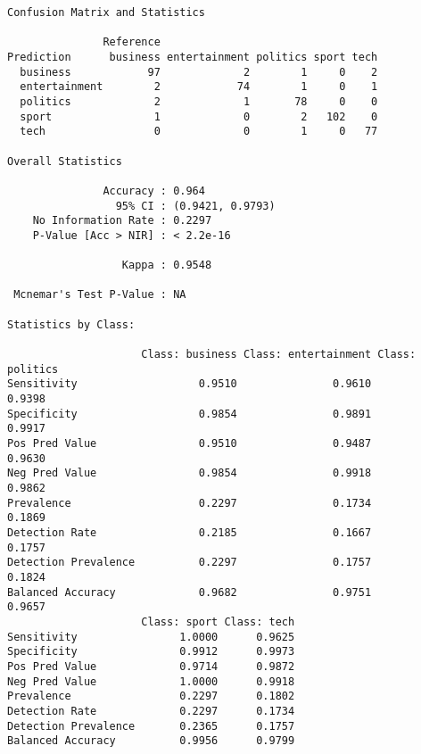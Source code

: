\documentclass[
  12pt,
  letterpaper,
  DIV=11,
  numbers=noendperiod]{scrartcl}
\newenvironment{Shaded}{\begin{snugshade}}{\end{snugshade}}
\newcommand{\CommentTok}[1]{\textcolor[rgb]{0.37,0.37,0.37}{#1}}
\newcommand{\FunctionTok}[1]{\textcolor[rgb]{0.28,0.35,0.67}{#1}}
\newcommand{\NormalTok}[1]{\textcolor[rgb]{0.00,0.23,0.31}{#1}}
\newcommand{\OtherTok}[1]{\textcolor[rgb]{0.00,0.23,0.31}{#1}}
\newcommand{\SpecialCharTok}[1]{\textcolor[rgb]{0.37,0.37,0.37}{#1}}
\newcommand{\StringTok}[1]{\textcolor[rgb]{0.13,0.47,0.30}{#1}}
\begin{document}
\begin{verbatim}
Confusion Matrix and Statistics

               Reference
Prediction      business entertainment politics sport tech
  business            97             2        1     0    2
  entertainment        2            74        1     0    1
  politics             2             1       78     0    0
  sport                1             0        2   102    0
  tech                 0             0        1     0   77

Overall Statistics
                                          
               Accuracy : 0.964           
                 95% CI : (0.9421, 0.9793)
    No Information Rate : 0.2297          
    P-Value [Acc > NIR] : < 2.2e-16       
                                          
                  Kappa : 0.9548          
                                          
 Mcnemar's Test P-Value : NA              

Statistics by Class:

                     Class: business Class: entertainment Class: politics
Sensitivity                   0.9510               0.9610          0.9398
Specificity                   0.9854               0.9891          0.9917
Pos Pred Value                0.9510               0.9487          0.9630
Neg Pred Value                0.9854               0.9918          0.9862
Prevalence                    0.2297               0.1734          0.1869
Detection Rate                0.2185               0.1667          0.1757
Detection Prevalence          0.2297               0.1757          0.1824
Balanced Accuracy             0.9682               0.9751          0.9657
                     Class: sport Class: tech
Sensitivity                1.0000      0.9625
Specificity                0.9912      0.9973
Pos Pred Value             0.9714      0.9872
Neg Pred Value             1.0000      0.9918
Prevalence                 0.2297      0.1802
Detection Rate             0.2297      0.1734
Detection Prevalence       0.2365      0.1757
Balanced Accuracy          0.9956      0.9799
\end{verbatim}

\begin{Shaded}
\end{Shaded}
\end{document}
